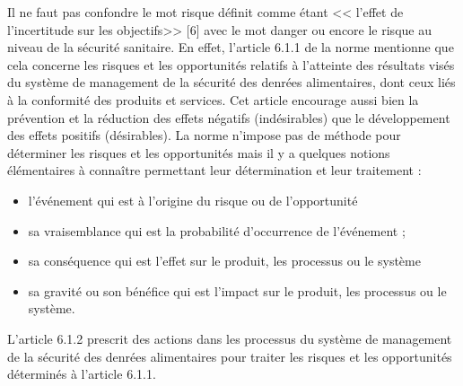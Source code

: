 \begin{spacing}{1.2}
Il ne faut pas  confondre le mot risque définit comme étant << l’effet de l’incertitude sur les objectifs>> [6] avec le mot danger ou encore le risque au niveau de la sécurité sanitaire. En effet, l’article 6.1.1 de la norme mentionne que cela concerne les risques et les opportunités relatifs à l’atteinte des résultats visés du système de management de la sécurité des denrées alimentaires, dont ceux liés à la conformité des produits et services.
 Cet article encourage aussi bien la prévention et la réduction des effets négatifs (indésirables) que le développement des effets positifs (désirables).
La norme n’impose pas de méthode pour déterminer les risques et les opportunités mais il y a quelques notions élémentaires à connaître  permettant leur détermination et leur traitement :

\begin{itemize}
	\item l’événement qui est à l’origine du risque ou de l’opportunité
	\item sa vraisemblance qui est la probabilité d’occurrence de l’événement ;
\item sa conséquence qui est l’effet sur le produit, les processus ou le système
\item sa gravité ou son bénéfice qui est l’impact sur le produit, les processus ou le système.
\end{itemize}


L’article 6.1.2 prescrit des actions dans les processus du système de management de la sécurité des denrées alimentaires pour traiter les risques et les opportunités déterminés à l’article 6.1.1.
\end{spacing}

